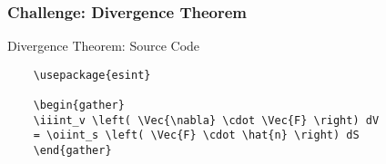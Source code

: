 \begin{frame}[fragile]
\frametitle{Challenge: Divergence Theorem} 
\begin{alertblock}{Divergence Theorem: Source Code}
    \small
    \begin{verbatim}
    \usepackage{esint}
    
    \begin{gather}
    \iiint_v \left( \Vec{\nabla} \cdot \Vec{F} \right) dV 
    = \oiint_s \left( \Vec{F} \cdot \hat{n} \right) dS 
    \end{gather}
    \end{verbatim}
\end{alertblock}
\end{frame}



